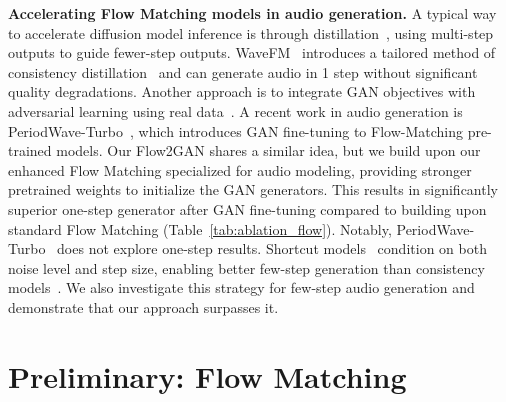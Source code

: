 \documentclass{article} %
\begin{document}
\noindent\textbf{Accelerating Flow Matching models in audio generation.} A typical way to accelerate diffusion model inference is through distillation~\citep{progressive_distillation,guided_distillation,consistency_model}, using multi-step outputs to guide fewer-step outputs. WaveFM~\citep{wavefm} introduces a tailored method of consistency distillation~\citep{consistency_model} and can generate audio in 1 step without significant quality degradations. 
Another approach is to integrate GAN objectives with adversarial learning using real data~\citep{fastdiff2, periodwave_turbo, revisiting_distillation}. 
A recent work in audio generation is PeriodWave-Turbo~\citep{periodwave_turbo}, which introduces GAN fine-tuning to Flow-Matching pre-trained models. Our Flow2GAN shares a similar idea, but we build upon our enhanced Flow Matching specialized for audio modeling, providing stronger pretrained weights to initialize the GAN generators. This results in significantly superior one-step generator after GAN fine-tuning compared to building upon standard Flow Matching (Table~\ref{tab:ablation_flow}). Notably, PeriodWave-Turbo~\citep{periodwave_turbo} does not explore one-step results. 
Shortcut models~\citep{shortcut} condition on both noise level and step size, enabling better few-step generation than consistency models~\citep{consistency_model}. We also investigate this strategy for few-step audio generation and demonstrate that our approach surpasses it.






\vspace{-1em}
\section{Preliminary: Flow Matching}
\vspace{-0.8em}
\end{document}
